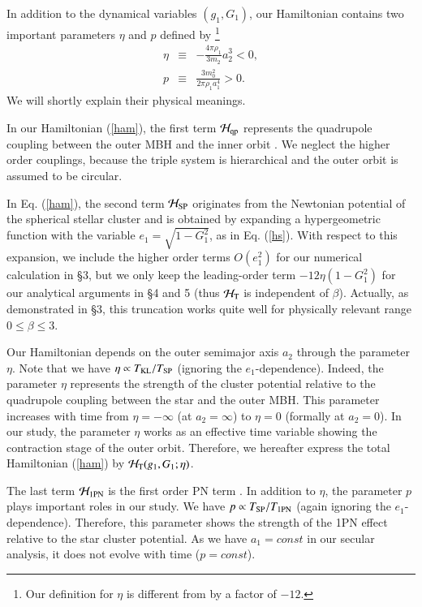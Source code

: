 \documentclass[useAMS,usenatbib,twocolumn]{mn2e}
\newcommand{\beqa}{\begin{eqnarray}}
\newcommand{\eeqa}{\end{eqnarray}}
\begin{document}
In addition
 to the dynamical variables $(g_1,G_1)$,  our Hamiltonian  contains two important parameters $\eta$ and $p$
defined by \footnote{Our definition for $\eta$ is different from \cite{iwasa2016} by a factor of $-12$. }
\beqa
\eta&\equiv&-\frac{4\pi\rho_{1}}{3m_{2}}a_{2}^{3}<0, \\
p&\equiv&\frac{3m_{0}^{2}}{2\pi\rho_{1}a_{1}^{4}}>0.\label{eta}
\eeqa
We will shortly explain their physical meanings.


In our Hamiltonian (\ref{ham}),
the first term $\mathcal{H}_{\rm qp}$ represents the quadrupole
coupling between the outer MBH and the inner orbit
\citep{fabrycky2007}. We neglect the higher order
couplings, because the triple system is hierarchical and the
outer orbit is assumed to be circular.


In Eq. (\ref{ham}), the second term $\mathcal{H}_{\rm SP}$ originates from the Newtonian
potential of the spherical stellar cluster \citep{merritt2013} and is obtained by expanding a
hypergeometric function with the variable $e_1=\sqrt{1-G_{1}^2}$, as in Eq. (\ref{hs}). With respect to this expansion, we include the higher order terms
$O(e_{1}^2)$ for our numerical calculation in \S 3, but we
only keep the leading-order term $-12\eta (1-G_1^2)$ for our
analytical arguments in \S 4 and 5 (thus $\mathcal{H}_{\rm T}$ is independent of $\beta$).
 Actually, as demonstrated in \S 3,   this truncation works quite well for physically relevant range $0\le \beta \le 3$.  


Our Hamiltonian depends on the  outer semimajor
axis $a_2$ through the parameter $\eta$.
Note that  we have $\eta \propto T_{\rm KL}/T_{\rm SP}$ (ignoring the 
$e_1$-dependence).
Indeed, the parameter $\eta$ represents the strength of the cluster potential
relative to the quadrupole coupling between the star and the outer MBH.
This parameter increases with time from $\eta=-\infty$ (at
$a_2=\infty$) to $\eta=0$ (formally at $a_2=0$). In our study, the parameter
$\eta$  works as an effective time variable showing the contraction
stage of the outer orbit.
Therefore, we hereafter express the total  Hamiltonian (\ref{ham}) by
 $\mathcal{H}_{\rm T}(g_{1}, G_{1};\eta)$. 



The last term $\mathcal{H}_{\rm 1PN}$ is the first order PN term
\citep{blaes2002}. In addition to $\eta$, the
parameter $p$ plays important roles in our study. We have
$p\propto T_{\rm SP}/T_{\rm 1PN}$ (again ignoring the $e_1$-dependence). 
Therefore, this parameter shows the strength of the 1PN effect
relative to the star cluster potential. As we have $a_1=const$
in our secular analysis, it does not evolve with
time ($p=const$).
\end{document}
